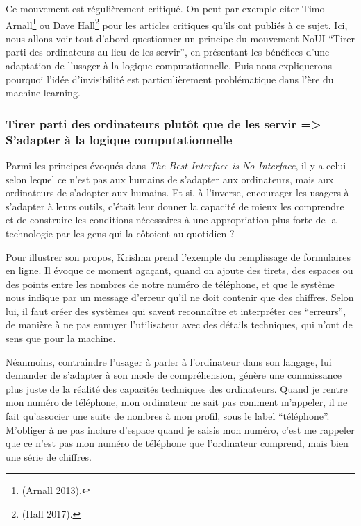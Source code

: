 \documentclass[]{article}
\begin{document}
Ce mouvement est régulièrement critiqué. On peut par exemple citer Timo
Arnall\footnote{(Arnall 2013).} ou Dave Hall\footnote{(Hall 2017).} pour
les articles critiques qu'ils ont publiés à ce sujet. Ici, nous allons
voir tout d'abord questionner un principe du mouvement NoUI ``Tirer
parti des ordinateurs au lieu de les servir'', en présentant les
bénéfices d'une adaptation de l'usager à la logique computationnelle.
Puis nous expliquerons pourquoi l'idée d'invisibilité est
particulièrement problématique dans l'ère du machine learning.

\newpage

\hypertarget{tirer-parti-des-ordinateurs-plutuxf4t-que-de-les-servir-sadapter-uxe0-la-logique-computationnelle}{%
\subsubsection{\texorpdfstring{\sout{Tirer parti des ordinateurs plutôt
que de les servir} =\textgreater{} S'adapter à la logique
computationnelle}{Tirer parti des ordinateurs plutôt que de les servir =\textgreater{} S'adapter à la logique computationnelle}}\label{tirer-parti-des-ordinateurs-plutuxf4t-que-de-les-servir-sadapter-uxe0-la-logique-computationnelle}}

Parmi les principes évoqués dans \emph{The Best Interface is No
Interface}, il y a celui selon lequel ce n'est pas aux humains de
s'adapter aux ordinateurs, mais aux ordinateurs de s'adapter aux
humains. Et si, à l'inverse, encourager les usagers à s'adapter à leurs
outils, c'était leur donner la capacité de mieux les comprendre et de
construire les conditions nécessaires à une appropriation plus forte de
la technologie par les gens qui la côtoient au quotidien ?

Pour illustrer son propos, Krishna prend l'exemple du remplissage de
formulaires en ligne. Il évoque ce moment agaçant, quand on ajoute des
tirets, des espaces ou des points entre les nombres de notre numéro de
téléphone, et que le système nous indique par un message d'erreur qu'il
ne doit contenir que des chiffres. Selon lui, il faut créer des systèmes
qui savent reconnaître et interpréter ces ``erreurs'', de manière à ne
pas ennuyer l'utilisateur avec des détails techniques, qui n'ont de sens
que pour la machine.

Néanmoins, contraindre l'usager à parler à l'ordinateur dans son
langage, lui demander de s'adapter à son mode de compréhension, génère
une connaissance plus juste de la réalité des capacités techniques des
ordinateurs. Quand je rentre mon numéro de téléphone, mon ordinateur ne
sait pas comment m'appeler, il ne fait qu'associer une suite de nombres
à mon profil, sous le label ``téléphone''. M'obliger à ne pas inclure
d'espace quand je saisis mon numéro, c'est me rappeler que ce n'est pas
mon numéro de téléphone que l'ordinateur comprend, mais bien une série
de chiffres.
\end{document}
